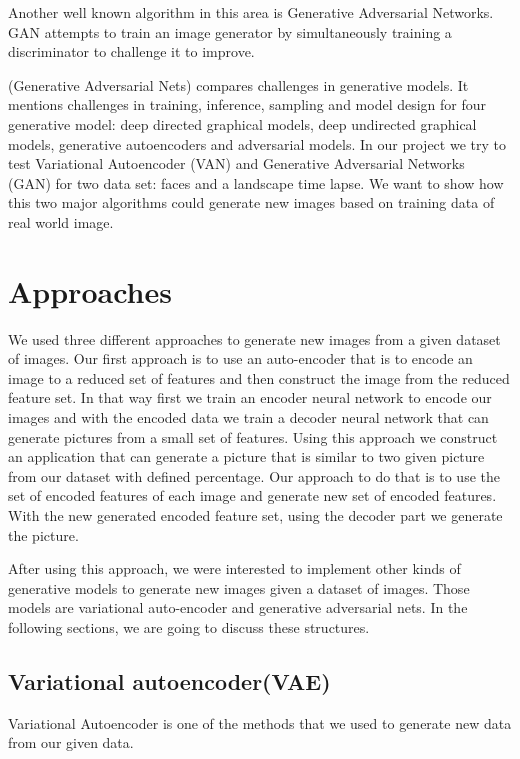 \documentclass{article} %
\begin{document}
Another well known algorithm in this area is Generative Adversarial Networks. GAN attempts to train an image generator by simultaneously training a discriminator to challenge it to improve.

(Generative Adversarial Nets) compares challenges in generative models. It mentions challenges in training, inference, sampling and model design for four generative model: deep directed graphical models,  deep undirected graphical models, generative autoencoders and adversarial models. 
In our project we try to test Variational Autoencoder (VAN) and Generative Adversarial Networks (GAN) for two data set: faces and a landscape time lapse. We want to show how this two major algorithms could generate new images based on training data of real world image. 

\section{Approaches}
We used three different approaches to generate new images from a given dataset of images. Our first approach is to use an auto-encoder that is to encode an image to a reduced set of features and then construct the image from the reduced feature set. In that way first we train an encoder neural network to encode our images and with the encoded data we train a decoder neural network that can generate pictures from a small set of features. Using this approach we construct an application that can generate a picture that is similar to two given picture from our dataset with defined percentage. Our approach to do that is to use the set of encoded features of each image and generate new set of encoded features. With the new generated encoded feature set, using the decoder part we generate the picture.

After using this approach, we were interested to implement other kinds of generative models to generate new images given a dataset of images. Those models are variational auto-encoder and generative adversarial nets. In the following sections, we are going to discuss these structures.

\subsection{Variational autoencoder(VAE)}
Variational Autoencoder is one of the methods that we used to generate new data from our given data. 
\end{document}
